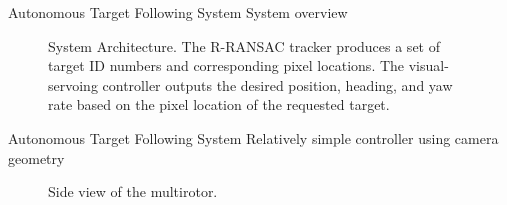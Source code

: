 \documentclass[9pt]{beamer}
\begin{document}
\begin{frame}{Autonomous Target Following System}
System overview
\begin{figure}[htbp]
	\centering
	\caption{System Architecture. The R-RANSAC tracker produces a set of target ID numbers and corresponding pixel locations. The visual-servoing controller outputs the desired position, heading, and yaw rate based on the pixel location of the requested target.}
	\label{system}
\end{figure}
\end{frame}

\begin{frame}{Autonomous Target Following System}
Relatively simple controller using camera geometry
\begin{figure}[thpb]
	\centering
	\caption{Side view of the multirotor.}
	\label{side_view}
\end{figure}
\end{frame}
\end{document}

